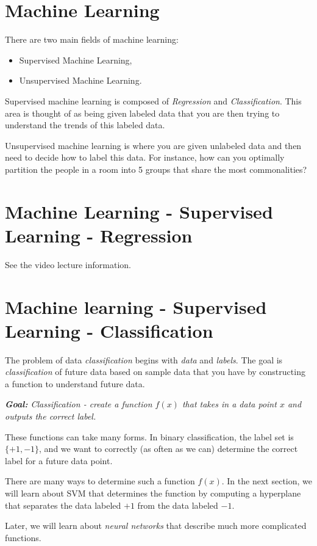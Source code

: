 \documentclass[../open-optimization/open-optimization.tex]{subfiles}
\begin{document}
\section{Machine Learning}
There are two main fields of machine learning:
\begin{itemize}
\item Supervised Machine Learning,
\item Unsupervised Machine Learning.
\end{itemize}
Supervised machine learning is composed of \emph{Regression} and \emph{Classification}.  This area is thought of as being given labeled data that you are then trying to understand the trends of this labeled data.

Unsupervised machine learning is where you are given unlabeled data and then need to decide how to label this data. For instance, how can you optimally partition the people in a room into 5 groups that share the most commonalities?

\section{Machine Learning - Supervised Learning - Regression}
See the video lecture information.


\section{Machine learning - Supervised Learning - Classification}
The problem of data \emph{classification} begins with \emph{data} and \emph{labels}.  The goal is \emph{classification} of future data based on sample data that you have by constructing a function to understand future data.
\begin{center}
\textit{
\textbf{Goal:} Classification - create a function $f(x)$ that takes in a data point $x$ and outputs the correct label.}
\end{center}

These functions can take many forms.  In binary classification, the label set is $\{+1, -1\}$, and we want to correctly (as often as we can) determine the correct label for a future data point.

There are many ways to determine such a function $f(x)$.  In the next section, we will learn about SVM that determines the function by computing a hyperplane that separates the data labeled $+1$ from the data labeled $-1$.

Later, we will learn about \emph{neural networks} that describe much more complicated functions.  
\end{document}
